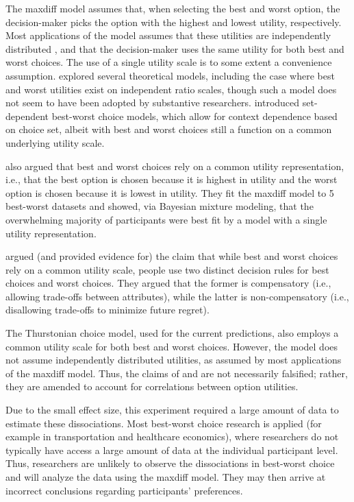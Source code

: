 The maxdiff model assumes that, when selecting the best and worst option, the decision-maker picks the option with the highest and lowest utility, respectively. Most applications of the model assumes that these utilities are independently distributed \parencite{flynn2014best}, and that the decision-maker uses the same utility for both best and worst choices. The use of a single utility scale is to some extent a convenience assumption. \textcite{marleyProbabilisticModelsBest2005} explored several theoretical models, including the case where best and worst utilities exist on independent ratio scales, though such a model does not seem to have been adopted by substantive researchers. \textcite{marleyProbabilisticModelsSetdependent2008} introduced set-dependent best-worst choice models, which allow for context dependence based on choice set, albeit with best and worst choices still a function on a common underlying utility scale. 

\textcite{hawkins2019like} also argued that best and worst choices rely on a common utility representation, i.e., that the best option is chosen because it is highest in utility and the worst option is chosen because it is lowest in utility. They fit the maxdiff model to 5 best-worst datasets and showed, via Bayesian mixture modeling, that the overwhelming majority of participants were best fit by a model with a single utility representation. 

\textcite{gervzinivc2021estimating} argued (and provided evidence for) the claim that while best and worst choices rely on a common utility scale, people use two distinct decision rules for best choices and worst choices. They argued that the former is compensatory (i.e., allowing trade-offs between attributes), while the latter is non-compensatory (i.e., disallowing trade-offs to minimize future regret). 

The Thurstonian choice model, used for the current predictions, also employs a common utility scale for both best and worst choices. However, the model does not assume independently distributed utilities, as assumed by most applications of the maxdiff model. Thus, the claims of \textcite{hawkinsBestTimesWorst2014} and \textcite{hawkins2019like} are not necessarily falsified; rather, they are amended to account for correlations between option utilities. 

Due to the small effect size, this experiment required a large amount of data to estimate these dissociations. Most best-worst choice research is applied (for example in transportation and healthcare economics), where researchers do not typically have access a large amount of data at the individual participant level. Thus, researchers are unlikely to observe the dissociations in best-worst choice and will analyze the data using the maxdiff model. They may then arrive at incorrect conclusions regarding participants' preferences. 

